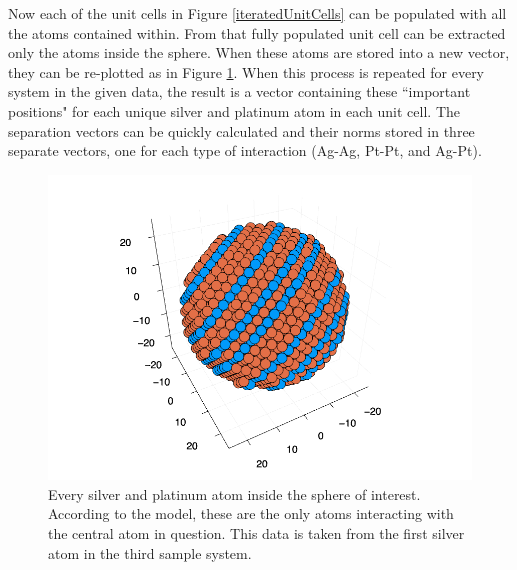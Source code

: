 Now each of the unit cells in Figure \ref{iteratedUnitCells} can be populated with all the atoms contained within. From that fully populated unit cell can be extracted only the atoms inside the sphere. When these atoms are stored into a new vector, they can be re-plotted as in Figure \ref{plotAgAtomSphere}. When this process is repeated for every system in the given data, the result is a vector containing these ``important positions" for each unique silver and platinum atom in each unit cell. The separation vectors can be quickly calculated and their norms stored in three separate vectors, one for each type of interaction (Ag-Ag, Pt-Pt, and Ag-Pt). 

\begin{figure}[h]
\includegraphics[scale = 0.6]{Figures/plotAgAtomSphere(3,1)}
\caption{Every silver and platinum atom inside the sphere of interest. According to the model, these are the only atoms interacting with the central atom in question. This data is taken from the first silver atom in the third sample system. 
\label{plotAgAtomSphere}} 
\end{figure}


